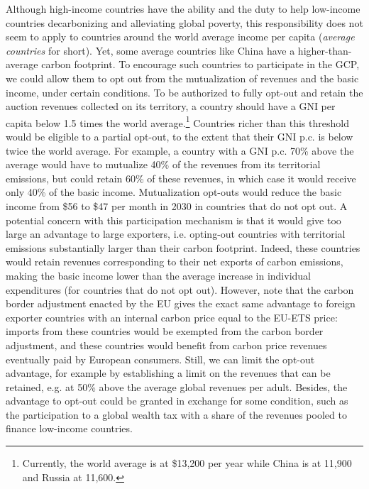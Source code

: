 \documentclass[12pt,english]{article}
\begin{document}
Although high-income countries have the ability and the duty to help low-income countries decarbonizing and alleviating global poverty, this responsibility does not seem to apply to countries around the world average income per capita (\textit{average countries} for short). Yet, some average countries like China have a higher-than-average carbon footprint. To encourage such countries to participate in the GCP, we could allow them to opt out from the mutualization of revenues and the basic income, under certain conditions. To be authorized to fully opt-out and retain the auction revenues collected on its territory, a country should have a GNI per capita below 1.5 times 
the world average.\footnote{Currently, the world average is at \$13,200 per year while China is at 11,900 and Russia at 11,600.} Countries richer than this threshold %
would be eligible to a partial opt-out, to the extent that their GNI p.c. is below twice the world average. For example, a country with a GNI p.c. 70\% above the average would have to mutualize 40\% of the revenues from its territorial emissions, but could retain 60\% of these revenues, in which case it would receive only 40\% of the basic income. Mutualization opt-outs would reduce the basic income from \$56 to \$47 per month in 2030 in countries that do not opt out. 
A potential concern with this participation mechanism is that it would give too large an advantage to large exporters, i.e. opting-out countries with territorial emissions substantially larger than their carbon footprint. Indeed, these countries would retain revenues corresponding to their net exports of carbon emissions, making the basic income lower than the average increase in individual expenditures (for countries that do not opt out). However, note that the carbon border adjustment enacted by the EU gives the exact same advantage to foreign exporter countries with an internal carbon price equal to the EU-ETS price: imports from these countries would be exempted from the carbon border adjustment, and these countries would benefit from carbon price revenues eventually paid by European consumers. Still, we can limit the opt-out advantage, for example by establishing a limit on the revenues that can be retained, e.g. at 50\% above the average global revenues per adult. %
Besides, the advantage to opt-out could be granted in exchange for some condition, such as the participation to a global wealth tax with a share of the revenues pooled to finance low-income countries. %
\end{document}
